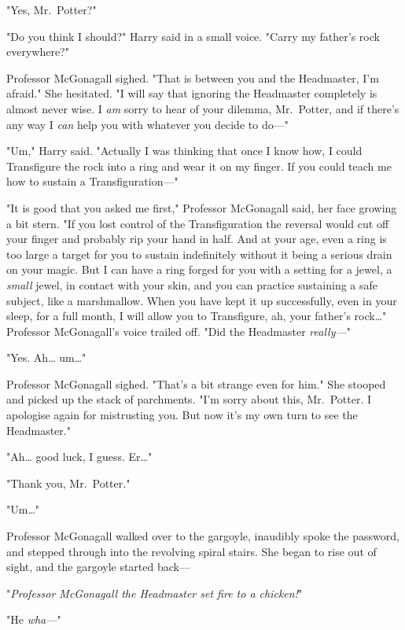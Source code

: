 "Yes, Mr.~Potter?"

"Do you think I should?" Harry said in a small voice. "Carry my father's rock 
everywhere?"

Professor McGonagall sighed. "That is between you and the Headmaster, I'm 
afraid." She hesitated. "I will say that ignoring the Headmaster completely is 
almost never wise. I \emph{am} sorry to hear of your dilemma, Mr.~Potter, and 
if there's any way I \emph{can} help you with whatever you decide to do---"

"Um," Harry said. "Actually I was thinking that once I know how, I could 
Transfigure the rock into a ring and wear it on my finger. If you could teach 
me how to sustain a Transfiguration---"

"It is good that you asked me first," Professor McGonagall said, her face 
growing a bit stern. "If you lost control of the Transfiguration the reversal 
would cut off your finger and probably rip your hand in half. And at your age, 
even a ring is too large a target for you to sustain indefinitely without it 
being a serious drain on your magic. But I can have a ring forged for you with 
a setting for a jewel, a \emph{small} jewel, in contact with your skin, and you 
can practice sustaining a safe subject, like a marshmallow. When you have kept 
it up successfully, even in your sleep, for a full month, I will allow you to 
Transfigure, ah, your father's rock{\ldots}" Professor McGonagall's voice 
trailed off. "Did the Headmaster \emph{really---}"

"Yes. Ah{\ldots} um{\ldots}"

Professor McGonagall sighed. "That's a bit strange even for him." She stooped 
and picked up the stack of parchments. "I'm sorry about this, Mr.~Potter. I 
apologise again for mistrusting you. But now it's my own turn to see the 
Headmaster."

"Ah{\ldots} good luck, I guess. Er{\ldots}"

"Thank you, Mr.~Potter."

"Um{\ldots}"

Professor McGonagall walked over to the gargoyle, inaudibly spoke the password, 
and stepped through into the revolving spiral stairs. She began to rise out of 
sight, and the gargoyle started back---

"\emph{Professor McGonagall the Headmaster set fire to a chicken!}"

"He \emph{wha---}"
